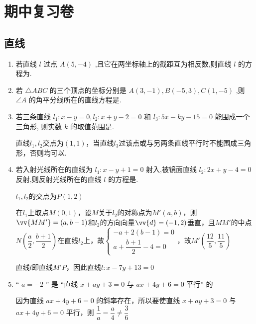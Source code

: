 \section*{期中复习卷}
\subsection*{直线}
\begin{enumerate}
    \item 若直线 $l$ 过点 $A\left( {5, - 4}\right)$ ,且它在两坐标轴上的截距互为相反数,则直线 $l$ 的方程为.
    \item 若 $\bigtriangleup {ABC}$ 的三个顶点的坐标分别是 $A\left( {3, - 1}\right) ,B\left( {-5,3}\right) ,C\left( {1, - 5}\right)$ ,则 $\angle A$ 的角平分线所在的直线方程是.
    \item 若三条直线 ${l}_{1} : x - y = 0,{l}_{2} : x + y - 2 = 0$ 和 ${l}_{3} : {5x} - {ky} - {15} = 0$ 能围成一个三角形, 则实数 $k$ 的取值范围是.
    \begin{jieda}
        直线$l_1, l_2$交点为$(1, 1)$，当直线$l_3$过该点或与另两条直线平行时不能围成三角形，否则均可以.
    \end{jieda}
    \item 若入射光线所在的直线为 ${l}_{1} : x - y + 1 = 0$ 射入,被镜面直线 ${l}_{2} : {2x} + y - 4 = 0$ 反射,则反射光线所在的直线 $l$ 的方程是.
    \begin{jieda}
        $l_1, l_2$的交点为$P(1,2)$
        
        在$l_1$上取点$M(0, 1)$，设$M$关于$l_2$的对称点为$M'(a, b)$，则$\vv{MM'} = (a, b - 1)$和$l_2$的方向向量$\vv{d} = (-1, 2)$垂直，且$MM'$的中点$N\left(\dfrac{a}{2}, \dfrac{b+1}{2}\right)$在直线$l_2$上，故$\left\{\begin{array}{l}
             -a+2(b-1) = 0  \\
             a + \dfrac{b+1}{2} - 4 = 0
        \end{array}\right.$，故$M'\left(\dfrac{12}{5}, \dfrac{11}{5}\right)$

        直线$l$即直线$M'P$，因此直线$l: x-7y+13=0$
    \end{jieda}
    \item “ $a =  - 2$ ” 是 “直线 $x + {ay} + 3 = 0$ 与 ${ax} + {4y} + 6 = 0$ 平行” 的
    \begin{jieda}
        因为直线 ${ax} + {4y} + 6 = 0$ 的斜率存在，所以要使直线 $x + {ay} + 3 = 0$ 与 ${ax} + {4y} + 6 = 0$ 平行，则 $\dfrac{1}{a} = \dfrac{a}{4} \neq  \dfrac{3}{6}$
        

\end{jieda}
\end{enumerate}
